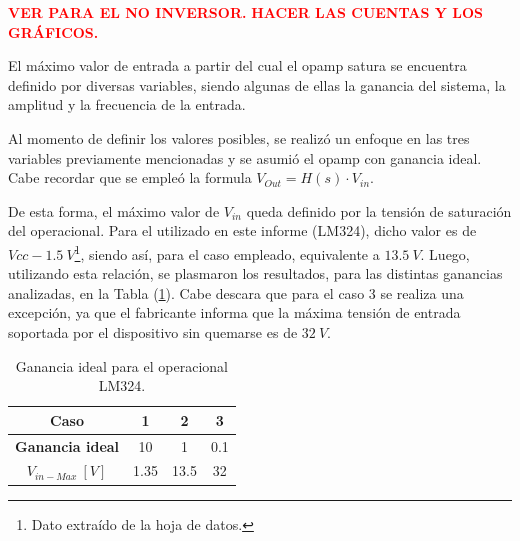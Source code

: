 \begin{center}
\textcolor{red}{\textbf{VER PARA EL NO INVERSOR.}}
\textcolor{red}{\textbf{HACER LAS CUENTAS Y LOS GRÁFICOS.}}
\end{center}

El máximo valor de entrada a partir del cual el opamp satura se encuentra definido por diversas variables, siendo algunas de ellas la ganancia del sistema, la amplitud y la frecuencia de la entrada.

Al momento de definir los valores posibles, se realizó un enfoque en las tres variables previamente mencionadas y se asumió el opamp con ganancia ideal. Cabe recordar que se empleó la formula $ V_{Out}=H(s)\cdot V_{in} $.

De esta forma, el máximo valor de $V_{in}$ queda definido por la tensión de saturación del operacional. Para el utilizado en este informe (LM324), dicho valor es de $Vcc - 1.5 \ V$\footnote{Dato extraído de la hoja de datos.}, siendo así, para el caso empleado, equivalente a $13.5 \ V$. Luego, utilizando esta relación, se plasmaron los resultados, para las distintas ganancias analizadas, en la Tabla (\ref{tab:gananciaideal}). Cabe descara que para el caso 3 se realiza una excepción, ya que el fabricante informa que la máxima tensión de entrada soportada por el dispositivo sin quemarse es de $32 \ V$.

\begin{table}[H]
\begin{center}
\label{tab:maxin}
\begin{tabular}{|c|c|c|c|}
\hline
\textbf{Caso}        & \textbf{1} & \textbf{2} & \textbf{3} \\ \hline
\textbf{Ganancia ideal}     & 10         & 1          & 0.1        \\ \hline
\textbf{$V_{in-Max} \ \left[ V \right]$} & 1.35       & 13.5       & 32         \\ \hline
\end{tabular}
\end{center}
\caption{Ganancia ideal para el operacional LM324.}
\label{tab:gananciaideal}
\end{table}

